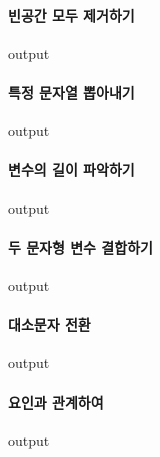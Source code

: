 \documentclass{book}
\begin{document}
\paragraph{빈공간 모두 제거하기}
\begin{Schunk}
\begin{Soutput}
output
\end{Soutput}
\end{Schunk}

\paragraph{특정 문자열 뽑아내기}
\begin{Schunk}
\begin{Soutput}
output
\end{Soutput}
\end{Schunk}

\paragraph{변수의 길이 파악하기}
\begin{Schunk}
\begin{Soutput}
output
\end{Soutput}
\end{Schunk}

\paragraph{두 문자형 변수 결합하기}
\begin{Schunk}
\begin{Soutput}
output
\end{Soutput}
\end{Schunk}

\paragraph{대소문자 전환} 
\begin{Schunk}
\begin{Soutput}
output
\end{Soutput}
\end{Schunk}

\paragraph{요인과 관계하여}
\begin{Schunk}
\begin{Soutput}
output
\end{Soutput}
\end{Schunk}
\end{document}
